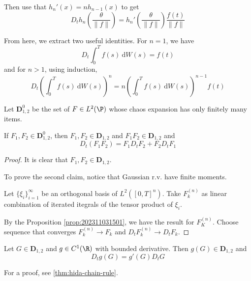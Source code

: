 Then use that $h_n'(x) = n h_{n-1}(x)$ to get 
\begin{equation}\label{eq:202310241449}
	D_t h_n \left( \frac{\theta}{\| f \|} \right) = h_n' \left( \frac{\theta}{\| f \|} \right) \frac{f(t)}{\| f \|}
\end{equation}

From here, we extract two useful identities. For $n = 1$, we have
\begin{equation*}
	D_t \int_0^T f(s) ~\mathrm{d}W(s) = f(t)
\end{equation*}
and for $n > 1$, using induction,
\begin{equation*}
	D_t \left( \int_0^T f(s) ~\mathrm{d}W(s) \right)^n = n \left( \int_0^T f(s) ~\mathrm{d}W(s) \right)^{n-1} f(t)
\end{equation*}

Let $\mathbf{D}_{1,2}^0$ be the set of $F \in L^2(\P)$ whose chaos expansion has only finitely many items.

\begin{theorem}\label{thm:product_rule}
	If $F_1, F_2 \in \mathbf{D}_{1,2}^0$, then $F_1, F_2 \in \mathbf{D}_{1,2}$ and $F_1 F_2 \in \mathbf{D}_{1,2}$ and 
	$$
	D_t(F_1 F_2) = F_1 D_t F_2 + F_2 D_t F_1
	$$
\end{theorem}

\begin{proof}
	It is clear that $F_1, F_2 \in \mathbf{D}_{1,2}$. 

	To prove the second claim, notice that Gaussian r.v. have finite moments.

	Let $\{ \xi_i \}_{i=1}^\infty$ be an orthogonal basis of $L^2([0,T]^n)$. Take $F_k^{(n)}$ as linear combination of iterated itegrals of the tensor product of $\xi_i$. 

	By the Proposition \ref{prop:202311031501}, we have the result for $F_K^{(n)}$. Choose sequence that converges $F_k^{(n)} \to F_k$ and $D_t F_k^{(n)} \to D_t F_k$. 
\end{proof}

\begin{theorem}\label{thm:chain_rule}
	Let $G \in \mathbf{D}_{1,2}$ and $g \in C^1(\R)$ with bounded derivative. Then $g(G) \in \mathbf{D}_{1,2}$ and
	\begin{equation}
		D_t g(G) = g'(G) D_t G
	\end{equation}
\end{theorem}

For a proof, see \ref{thm:hida-chain-rule}.

